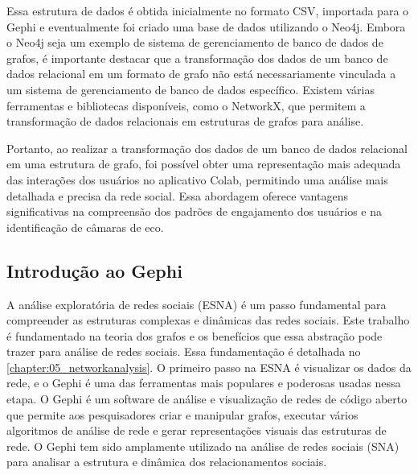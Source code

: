 Essa estrutura de dados é obtida inicialmente no formato CSV, importada para o Gephi e eventualmente foi criado uma base de dados utilizando o Neo4j. Embora o Neo4j seja um exemplo de sistema de gerenciamento de banco de dados de grafos, é importante destacar que a transformação dos dados de um banco de dados relacional em um formato de grafo não está necessariamente vinculada a um sistema de gerenciamento de banco de dados específico. Existem várias ferramentas e bibliotecas disponíveis, como o NetworkX, que permitem a transformação de dados relacionais em estruturas de grafos para análise.

Portanto, ao realizar a transformação dos dados de um banco de dados relacional em uma estrutura de grafo, foi possível obter uma representação mais adequada das interações dos usuários no aplicativo Colab, permitindo uma análise mais detalhada e precisa da rede social. Essa abordagem oferece vantagens significativas na compreensão dos padrões de engajamento dos usuários e na identificação de câmaras de eco.

\subsection*{Introdução ao Gephi}

A análise exploratória de redes sociais (ESNA) é um passo fundamental para compreender as estruturas complexas e dinâmicas das redes sociais. Este trabalho é fundamentado na teoria dos grafos e os benefícios que essa abstração pode trazer para análise de redes sociais. Essa fundamentação é detalhada no \autoref{chapter:05_networkanalysis}. O primeiro passo na ESNA é visualizar os dados da rede, e o Gephi é uma das ferramentas mais populares e poderosas usadas nessa etapa. O Gephi é um software de análise e visualização de redes de código aberto que permite aos pesquisadores criar e manipular grafos, executar vários algoritmos de análise de rede e gerar representações visuais das estruturas de rede. O Gephi tem sido amplamente utilizado na análise de redes sociais (SNA) para analisar a estrutura e dinâmica dos relacionamentos sociais.

